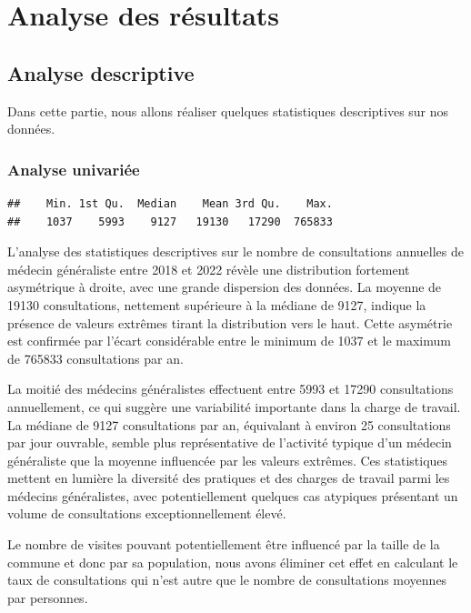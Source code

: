 \documentclass[
]{article}
\begin{document}
\hypertarget{analyse-des-ruxe9sultats}{%
\section{Analyse des résultats}\label{analyse-des-ruxe9sultats}}

\hypertarget{analyse-descriptive}{%
\subsection{Analyse descriptive}\label{analyse-descriptive}}

Dans cette partie, nous allons réaliser quelques statistiques
descriptives sur nos données.

\hypertarget{analyse-univariuxe9e}{%
\subsubsection{Analyse univariée}\label{analyse-univariuxe9e}}

\begin{verbatim}
##    Min. 1st Qu.  Median    Mean 3rd Qu.    Max. 
##    1037    5993    9127   19130   17290  765833
\end{verbatim}

L'analyse des statistiques descriptives sur le nombre de consultations
annuelles de médecin généraliste entre 2018 et 2022 révèle une
distribution fortement asymétrique à droite, avec une grande dispersion
des données. La moyenne de 19130 consultations, nettement supérieure à
la médiane de 9127, indique la présence de valeurs extrêmes tirant la
distribution vers le haut. Cette asymétrie est confirmée par l'écart
considérable entre le minimum de 1037 et le maximum de 765833
consultations par an.

La moitié des médecins généralistes effectuent entre 5993 et 17290
consultations annuellement, ce qui suggère une variabilité importante
dans la charge de travail. La médiane de 9127 consultations par an,
équivalant à environ 25 consultations par jour ouvrable, semble plus
représentative de l'activité typique d'un médecin généraliste que la
moyenne influencée par les valeurs extrêmes. Ces statistiques mettent en
lumière la diversité des pratiques et des charges de travail parmi les
médecins généralistes, avec potentiellement quelques cas atypiques
présentant un volume de consultations exceptionnellement élevé.

Le nombre de visites pouvant potentiellement être influencé par la
taille de la commune et donc par sa population, nous avons éliminer cet
effet en calculant le taux de consultations qui n'est autre que le
nombre de consultations moyennes par personnes.
\end{document}
